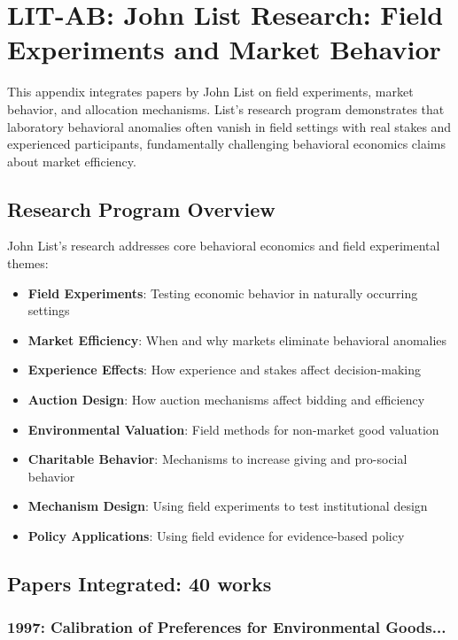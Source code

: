 \section{LIT-AB: John List Research: Field Experiments and Market Behavior}
\label{app:litab}

This appendix integrates papers by John List on field experiments, market behavior, and allocation
mechanisms. List's research program demonstrates that laboratory behavioral anomalies often vanish
in field settings with real stakes and experienced participants, fundamentally challenging behavioral
economics claims about market efficiency.

\subsection{Research Program Overview}

John List's research addresses core behavioral economics and field experimental themes:

\begin{itemize}
  \item \textbf{Field Experiments}: Testing economic behavior in naturally occurring settings
  \item \textbf{Market Efficiency}: When and why markets eliminate behavioral anomalies
  \item \textbf{Experience Effects}: How experience and stakes affect decision-making
  \item \textbf{Auction Design}: How auction mechanisms affect bidding and efficiency
  \item \textbf{Environmental Valuation}: Field methods for non-market good valuation
  \item \textbf{Charitable Behavior}: Mechanisms to increase giving and pro-social behavior
  \item \textbf{Mechanism Design}: Using field experiments to test institutional design
  \item \textbf{Policy Applications}: Using field evidence for evidence-based policy
\end{itemize}

\subsection{Papers Integrated: 40 works}


\subsubsection{1997: Calibration of Preferences for Environmental Goods...}

